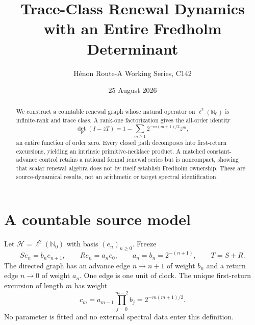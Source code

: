 \documentclass[11pt]{article}
\title{Trace-Class Renewal Dynamics\\with an Entire Fredholm Determinant}
\author{H\'enon Route-A Working Series, C142}
\date{25 August 2026}
\newcommand{\Hh}{\mathcal H}
\begin{document}
\maketitle
\begin{abstract}
We construct a countable renewal graph whose natural operator on
$\ell^2(\mathbb N_0)$ is infinite-rank and trace class.  A rank-one
factorization gives the all-order identity
\[
 \det_{\!F}(I-zT)=1-\sum_{m\ge1}2^{-m(m+1)/2}z^m,
\]
an entire function of order zero.  Every closed path decomposes into
first-return excursions, yielding an intrinsic primitive-necklace product.
A matched constant-advance control retains a rational formal renewal series
but is noncompact, showing that scalar renewal algebra does not by itself
establish Fredholm ownership.  These are source-dynamical results, not an
arithmetic or target spectral identification.
\end{abstract}

\section{A countable source model}
Let $\Hh=\ell^2(\mathbb N_0)$ with basis $(e_n)_{n\ge0}$.  Freeze
\[
 Se_n=b_ne_{n+1},\qquad Re_n=a_ne_0,\qquad
 a_n=b_n=2^{-(n+1)},\qquad T=S+R.
\]
The directed graph has an advance edge $n\to n+1$ of weight $b_n$ and a
return edge $n\to0$ of weight $a_n$.  One edge is one unit of clock.  The
unique first-return excursion of length $m$ has weight
\begin{equation}\label{eq:cm}
 c_m=a_{m-1}\prod_{j=0}^{m-2}b_j=2^{-m(m+1)/2}.
\end{equation}
No parameter is fitted and no external spectral data enter this definition.
\end{document}

